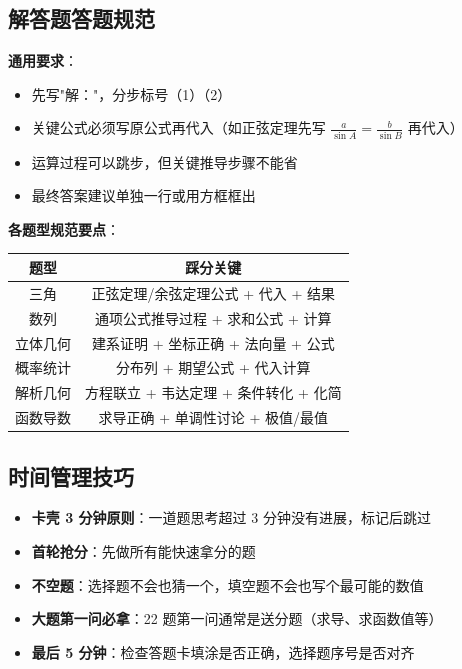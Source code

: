 \subsection{解答题答题规范}

\textbf{通用要求}：
\begin{itemize}
  \item 先写"解："，分步标号（1）（2）
  \item 关键公式必须写原公式再代入（如正弦定理先写 $\frac{a}{\sin A} = \frac{b}{\sin B}$ 再代入）
  \item 运算过程可以跳步，但关键推导步骤不能省
  \item 最终答案建议单独一行或用方框框出
\end{itemize}

\textbf{各题型规范要点}：

\begin{center}
\begin{tabular}{c|c}
\textbf{题型} & \textbf{踩分关键} \\ \hline
三角 & 正弦定理/余弦定理公式 + 代入 + 结果 \\
数列 & 通项公式推导过程 + 求和公式 + 计算 \\
立体几何 & 建系证明 + 坐标正确 + 法向量 + 公式 \\
概率统计 & 分布列 + 期望公式 + 代入计算 \\
解析几何 & 方程联立 + 韦达定理 + 条件转化 + 化简 \\
函数导数 & 求导正确 + 单调性讨论 + 极值/最值
\end{tabular}
\end{center}

\subsection{时间管理技巧}

\begin{itemize}
  \item \textbf{卡壳 3 分钟原则}：一道题思考超过 3 分钟没有进展，标记后跳过
  \item \textbf{首轮抢分}：先做所有能快速拿分的题
  \item \textbf{不空题}：选择题不会也猜一个，填空题不会也写个最可能的数值
  \item \textbf{大题第一问必拿}：22 题第一问通常是送分题（求导、求函数值等）
  \item \textbf{最后 5 分钟}：检查答题卡填涂是否正确，选择题序号是否对齐
\end{itemize}

